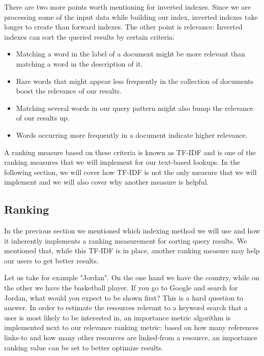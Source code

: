 There are two more points worth mentioning for inverted indexes. Since we are processing some of the input data while building our index, inverted indexes take longer to create than forward indexes. The other point is relevance: Inverted indexes can sort the queried results by certain criteria: 

\begin{itemize}
    \item Matching a word in the label of a document might be more relevant than matching a word in the description of it.
    \item Rare words that might appear less frequently in the collection of documents boost the relevance of our results.
    \item Matching several words in our query pattern might also bump the relevance of our results up.
    \item Words occurring more frequently in a document indicate higher relevance.
\end{itemize}

A ranking measure based on these criteria is known as TF-IDF and is one of the ranking measures that we will implement for our text-based lookups. In the following section, we will cover how TF-IDF is not the only measure that we will implement and we will also cover why another measure is helpful.


\subsection{Ranking}
\label{chap:pagerank}

In the previous section we mentioned which indexing method we will use and how it inherently implements a ranking measurement for sorting query results. We mentioned that, while this TF-IDF is in place, another ranking measure may help our users to get better results.

Let us take for example "Jordan". On the one hand we have the country, while on the other we have the basketball player. If you go to Google and search for Jordan, what would you expect to be shown first? This is a hard question to answer. In order to estimate the resources relevant to a keyword search that a user is most likely to be interested in, an importance metric algorithm is implemented next to our relevance ranking metric: based on how many references links-to and how many other resources are linked-from a resource, an importance ranking value can be set to better optimize results.

